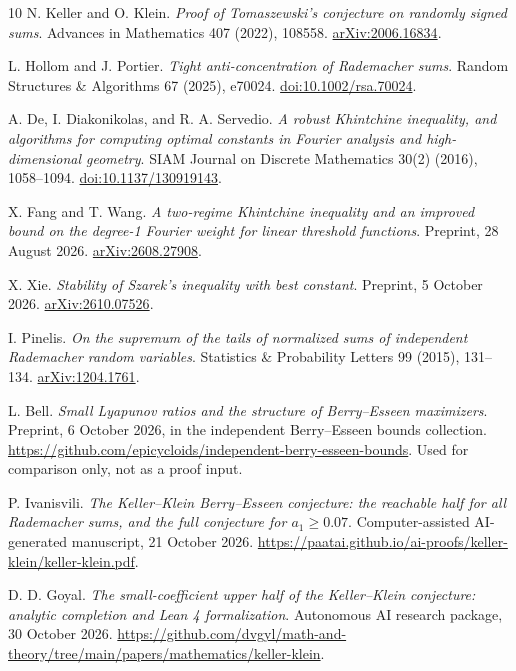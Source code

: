 \documentclass[11pt]{article}
\theoremstyle{remark}\newtheorem{remark}[theorem]{Remark}
\begin{document}
\begin{thebibliography}{10}
 N. Keller and O. Klein.
\emph{Proof of Tomaszewski's conjecture on randomly signed sums}.
Advances in Mathematics 407 (2022), 108558.
\href{https://arxiv.org/abs/2006.16834}{arXiv:2006.16834}.

 L. Hollom and J. Portier.
\emph{Tight anti-concentration of Rademacher sums}.
Random Structures \& Algorithms 67 (2025), e70024.
\href{https://doi.org/10.1002/rsa.70024}{doi:10.1002/rsa.70024}.

 A. De, I. Diakonikolas, and R. A. Servedio.
\emph{A robust Khintchine inequality, and algorithms for computing optimal
constants in Fourier analysis and high-dimensional geometry}.
SIAM Journal on Discrete Mathematics 30(2) (2016), 1058--1094.
\href{https://doi.org/10.1137/130919143}{doi:10.1137/130919143}.

 X. Fang and T. Wang.
\emph{A two-regime Khintchine inequality and an improved bound on the
degree-1 Fourier weight for linear threshold functions}.
Preprint, 28 August 2026.
\href{https://arxiv.org/abs/2608.27908}{arXiv:2608.27908}.

 X. Xie.
\emph{Stability of Szarek's inequality with best constant}.
Preprint, 5 October 2026.
\href{https://arxiv.org/abs/2610.07526}{arXiv:2610.07526}.

 I. Pinelis.
\emph{On the supremum of the tails of normalized sums of independent
Rademacher random variables}.
Statistics \& Probability Letters 99 (2015), 131--134.
\href{https://arxiv.org/abs/1204.1761}{arXiv:1204.1761}.

 L. Bell.
\emph{Small Lyapunov ratios and the structure of Berry--Esseen maximizers}.
Preprint, 6 October 2026, in the independent Berry--Esseen bounds collection.
\url{https://github.com/epicycloids/independent-berry-esseen-bounds}.
Used for comparison only, not as a proof input.

 P. Ivanisvili.
\emph{The Keller--Klein Berry--Esseen conjecture: the reachable half for
all Rademacher sums, and the full conjecture for $a_1\ge0.07$}.
Computer-assisted AI-generated manuscript, 21 October 2026.
\url{https://paatai.github.io/ai-proofs/keller-klein/keller-klein.pdf}.

 D. D. Goyal.
\emph{The small-coefficient upper half of the Keller--Klein conjecture:
analytic completion and Lean 4 formalization}.
Autonomous AI research package, 30 October 2026.
\url{https://github.com/dvgyl/math-and-theory/tree/main/papers/mathematics/keller-klein}.


\end{thebibliography}
\end{document}
